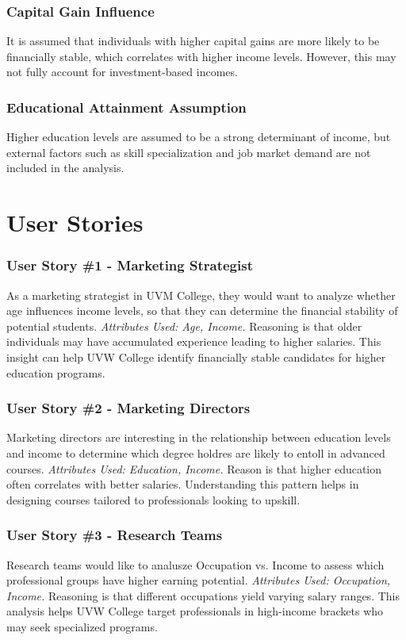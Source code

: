 \documentclass[journal,onecolumn]{IEEEtran}
\begin{document}
\subsubsection{Capital Gain Influence}
It is assumed that individuals with higher capital gains are more likely to 
be financially stable, which correlates with higher income levels. However, 
this may not fully account for investment-based incomes.
\subsubsection{Educational Attainment Assumption}
Higher education levels are assumed to be a strong determinant of income, 
but external factors such as skill specialization and job market demand are 
not included in the analysis.

\section{User Stories}
\subsubsection{User Story \#1 - Marketing Strategist} As a marketing strategist in UVM 
College, they would want to analyze whether age influences income levels, 
so that they can determine the financial stability of potential students. 
\textit{Attributes Used: Age, Income.} Reasoning is that older individuals may have 
accumulated experience leading to higher salaries. This insight can help 
UVW College identify financially stable candidates for higher education 
programs.
\subsubsection{User Story \#2 - Marketing Directors} Marketing directors are interesting in 
the relationship between education levels and income to determine which 
degree holdres are likely to entoll in advanced courses. \textit{Attributes Used: 
Education, Income.} Reason is that higher education often correlates with 
better salaries. Understanding this pattern helps in designing courses 
tailored to professionals looking to upskill.
\subsubsection{User Story \#3 - Research Teams} Research teams would like to analusze Occupation 
vs. Income to assess which professional groups have higher earning potential. 
\textit{Attributes Used: Occupation, Income.} Reasoning is that different occupations 
yield varying salary ranges. This analysis helps UVW College target professionals 
in high-income brackets who may seek specialized programs.
\end{document}
